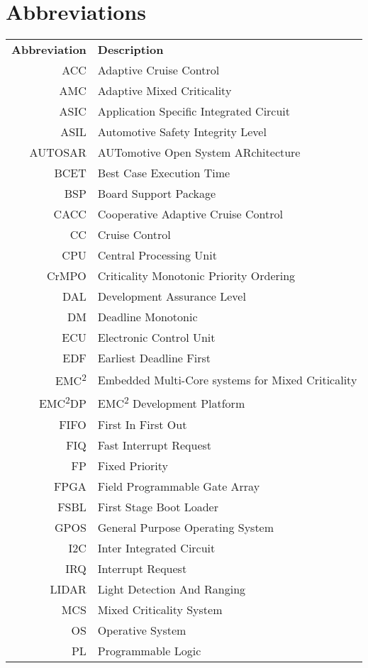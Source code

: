 \chapter*{Abbreviations}
\begin{tabular}{r l}
\textbf{Abbreviation} 	& \textbf{Description} \vspace{.5em} \\
ACC                &Adaptive Cruise Control\\
AMC                &Adaptive Mixed Criticality\\
ASIC        &Application Specific Integrated Circuit\\
ASIL        &Automotive Safety Integrity Level\\
AUTOSAR        &AUTomotive Open System ARchitecture\\
BCET        &Best Case Execution Time\\
BSP                &Board Support Package\\
CACC        &Cooperative Adaptive Cruise Control\\
CC                &Cruise Control\\
CPU                &Central Processing Unit\\
CrMPO        &Criticality Monotonic Priority Ordering\\
DAL                &Development Assurance Level\\
DM                &Deadline Monotonic\\
ECU                &Electronic Control Unit\\
EDF                &Earliest Deadline First\\
EMC\textsuperscript{2}        &Embedded Multi-Core systems for Mixed Criticality\\
EMC\textsuperscript{2}DP        &EMC\textsuperscript{2} Development Platform\\
FIFO        &First In First Out\\
FIQ                &Fast Interrupt Request\\
FP                &Fixed Priority\\
FPGA        &Field Programmable Gate Array\\
FSBL        &First Stage Boot Loader\\
GPOS        &General Purpose Operating System\\
I2C                &Inter Integrated Circuit\\
IRQ                &Interrupt Request\\
LIDAR        &Light Detection And Ranging\\
MCS                &Mixed Criticality System\\
OS                &Operative System\\
PL                &Programmable Logic\\
\end{tabular}

